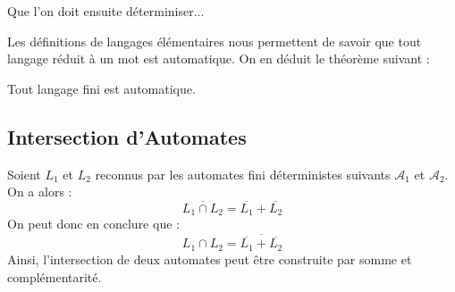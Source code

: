 \begin{example}
\begin{center}
\begin{minipage}{0.45\textwidth}
        \end{minipage}%
        \hfill 
        \begin{minipage}{0.45\textwidth}
        \end{minipage}
    \end{center}

    Que l'on doit ensuite déterminiser... 
\end{example}

Les définitions de langages élémentaires nous permettent de savoir que tout langage réduit à un mot est automatique. 
On en déduit le théorème suivant : 

\begin{theorem}
    Tout langage fini est automatique. 
\end{theorem}


\subsection{Intersection d'Automates}

\begin{proposition}
    Soient $L_1$ et $L_2$ reconnus par les automates fini déterministes suivants $ \mathcal{A}_1$ et $ \mathcal{A}_2$. 
    On a alors : 
        \[ \overline{L_1 \cap L_2} = \overline{L_1} + \overline{L_2} \]
    On peut donc en conclure que : 
        \[ \boxed{L_1 \cap L_2 = \overline{\overline{L_1} + \overline{L_2}}} \]  
    Ainsi, l'intersection de deux automates peut être construite par somme et complémentarité. 
\end{proposition}

